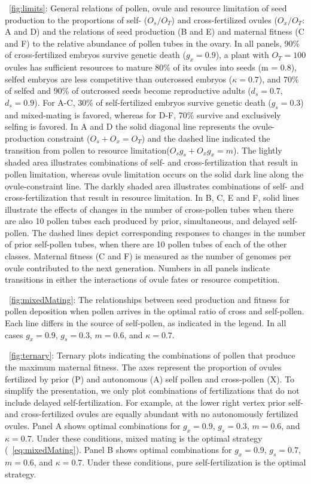 \documentclass[letterpaper,titlepage]{scrartcl}
\begin{document}
{\fref}~\ref{fig:limits}: General relations of pollen, ovule and
resource limitation of seed production to the proportions of self-
($O_{s}/O_{T}$) and cross-fertilized ovules ($O_{x}/O_{T}$: A and D)
and the relations of seed production (B and E) and maternal fitness (C
and F) to the relative abundance of pollen tubes in the ovary. In all
panels, 90\% of cross-fertilized embryos survive genetic death
($g_{x}=0.9$), a plant with $O_{T}=100$ ovules has sufficient
resources to mature 80\% of its ovules into seeds (m = 0.8), selfed
embryos are less competitive than outcrossed embryos ($\kappa =0.7$),
and 70\% of selfed and 90\% of outcrossed seeds become reproductive
adults ($d_{s}=0.7$, $d_{s}=0.9$). For A-C, 30\% of self-fertilized
embryos survive genetic death ($g_{s}=0.3$) and mixed-mating is
favored, whereas for D-F, 70\% survive and exclusively selfing is
favored. In A and D the solid diagonal line represents the
ovule-production constraint ($O_{s}+O_{x}=O_{T}$) and the dashed line
indicated the transition from pollen to resource
limitation($O_{s}g_{s}+O_{x}g_{x}=m$). The lightly shaded area
illustrates combinations of self- and cross-fertilization that result
in pollen limitation, whereas ovule limitation occurs on the solid
dark line along the ovule-constraint line. The darkly shaded area
illustrates combinations of self- and cross-fertilization that result
in resource limitation. In B, C, E and F, solid lines illustrate the
effects of changes in the number of cross-pollen tubes when there are
also 10 pollen tubes each produced by prior, simultaneous, and delayed
self-pollen. The dashed lines depict corresponding responses to
changes in the number of prior self-pollen tubes, when there are 10
pollen tubes of each of the other classes. Maternal fitness (C and F)
is measured as the number of genomes per ovule contributed to the next
generation. Numbers in all panels indicate transitions in either the
interactions of ovule fates or resource competition.

{\fref}~\ref{fig:mixedMating}: The relationships between seed
production and fitness for pollen deposition when pollen arrives in
the optimal ratio of cross and self-pollen. Each line differs in the
source of self-pollen, as indicated in the legend. In all cases
$g_{x}=0.9$, $g_{s}=0.3$, $m=0.6$, and $\kappa =0.7$.

{\fref}~\ref{fig:ternary}: Ternary plots indicating the combinations
of pollen that produce the maximum maternal fitness. The axes
represent the proportion of ovules fertilized by prior (P) and
autonomous (A) self pollen and cross-pollen (X). To simplify the
presentation, we only plot combinations of fertilizations that do not
include delayed self-fertilization. For example, at the lower right
vertex prior self- and cross-fertilized ovules are equally abundant
with no autonomously fertilized ovules. Panel A shows optimal
combinations for $g_{x}=0.9$, $g_{s}=0.3$, $m=0.6$, and $\kappa
=0.7$. Under these conditions, mixed mating is the optimal strategy
({\eref}~\eqref{eq:mixedMating}). Panel B shows optimal combinations for
$g_{x}=0.9$, $g_{s}=0.7$, $m=0.6$, and $\kappa =0.7$. Under these
conditions, pure self-fertilization is the optimal strategy.
\end{document}
